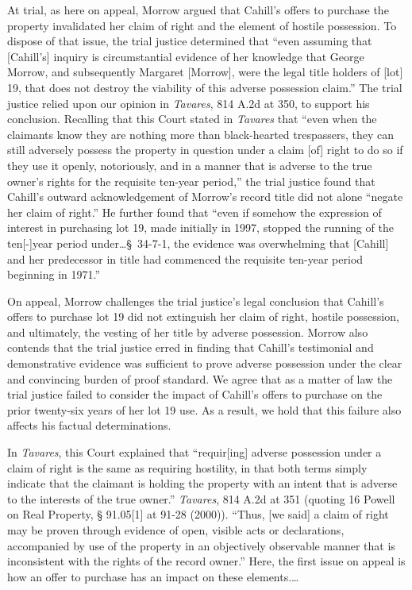 At trial, as here on appeal, Morrow argued that Cahill's offers to purchase the
property invalidated her claim of right and the element of hostile possession.
To dispose of that issue, the trial justice determined that ``even assuming
that [Cahill's] inquiry is circumstantial evidence of her knowledge that George
Morrow, and subsequently Margaret [Morrow], were the legal title holders of
[lot] 19, that does not destroy the viability of this adverse possession
claim.'' The trial justice relied upon our opinion in \textit{Tavares}, 814
A.2d at 350, to support his conclusion. Recalling that this Court stated in
\textit{Tavares} that ``even when the claimants know they are nothing more than
black-hearted trespassers, they can still adversely possess the property in
question under a claim [of] right to do so if they use it openly, notoriously,
and in a manner that is adverse to the true owner's rights for the requisite
ten-year period,'' the trial justice found that Cahill's outward
acknowledgement of Morrow's record title did not alone ``negate her claim of
right.'' He further found that ``even if somehow the expression of interest in
purchasing lot 19, made initially in 1997, stopped the running of the
ten[-]year period under\ldots \S~34-7-1, the evidence was overwhelming that
[Cahill] and her predecessor in title had commenced the requisite ten-year
period beginning in 1971.''


On appeal, Morrow challenges the trial justice's legal conclusion that Cahill's
offers to purchase lot 19 did not extinguish her claim of right, hostile
possession, and ultimately, the vesting of her title by adverse possession.
Morrow also contends that the trial justice erred in finding that Cahill's
testimonial and demonstrative evidence was sufficient to prove adverse
possession under the clear and convincing burden of proof standard. We agree
that as a matter of law the trial justice failed to consider the impact of
Cahill's offers to purchase on the prior twenty-six years of her lot 19 use. As
a result, we hold that this failure also affects his factual determinations.


In \textit{Tavares}, this Court explained that ``requir[ing] adverse possession
under a claim of right is the same as requiring hostility, in that both terms
simply indicate that the claimant is holding the property with an intent that
is adverse to the interests of the true owner.'' \textit{Tavares}, 814 A.2d at
351 (quoting 16 Powell on Real Property, {\S} 91.05[1] at 91-28 (2000)).
``Thus, [we said] a claim of right may be proven through evidence of open,
visible acts or declarations, accompanied by use of the property in an
objectively observable manner that is inconsistent with the rights of the
record owner.'' Here, the first issue on appeal is how an offer to purchase has
an impact on these elements.\ldots

